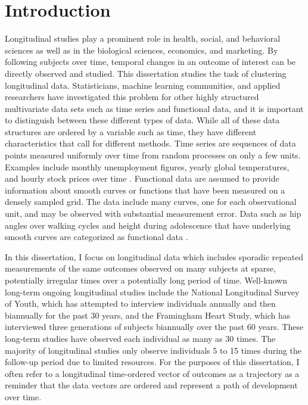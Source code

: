 \chapter{Introduction}\label{chap:intro}

Longitudinal studies play a prominent role in health, social, and behavioral sciences as well as in the biological sciences, economics, and marketing. By following subjects over time, temporal changes in an outcome of interest can be directly observed and studied. This dissertation studies the task of clustering longitudinal data. Statisticians, machine learning communities, and applied researchers have investigated this problem for other highly structured multivariate data sets such as time series and functional data, and it is important to distinguish between these different types of data. While all of these data structures are ordered by a variable such as time, they have different characteristics that call for different methods. Time series are sequences of data points measured uniformly over time from random processes on only a few units. Examples include monthly unemployment figures, yearly global temperatures, and hourly stock prices over time \cite{shumway2011}. Functional data are assumed to provide information about smooth curves or functions that have been measured on a densely sampled grid. The data include many curves, one for each observational unit, and may be observed with substantial measurement error. Data such as hip angles over walking cycles and height during adolescence that have underlying smooth curves are categorized as functional data \cite{ramsay2002,ramsay2005}. 

In this dissertation, I focus on longitudinal data which includes sporadic repeated measurements of the same outcomes observed on many subjects at sparse, potentially irregular times over a potentially long period of time. Well-known long-term ongoing longitudinal studies include the National Longitudinal Survey of Youth, which has attempted to interview individuals annually and then biannually for the past 30 years, and the Framingham Heart Study, which has interviewed three generations of subjects biannually over the past 60 years. These long-term studies have observed each individual as many as 30 times. The majority of longitudinal studies only observe individuals 5 to 15 times during the follow-up period due to limited resources. For the purposes of this dissertation, I often refer to a longitudinal time-ordered vector of outcomes as a trajectory as a reminder that the data vectors are ordered and represent a path of development over time. 

